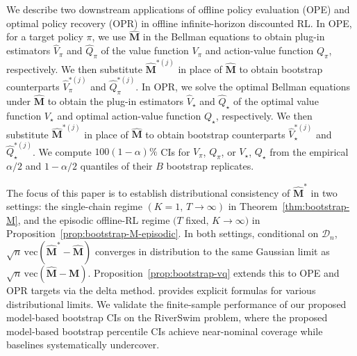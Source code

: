 \documentclass{article}
\numberwithin{equation}{section}
\begin{document}
We describe two downstream applications of offline policy evaluation (OPE) and optimal policy recovery (OPR) in offline infinite-horizon discounted RL.
In OPE, for a target policy $\pi$, we use $\hat{\mathbf{M}}$ in the Bellman equations to obtain plug-in estimators $\hat V_\pi$ and $\hat Q_\pi$ of the value function $V_\pi$ and action-value function $Q_\pi$, respectively.
We then substitute $\hat{\mathbf{M}}^{\ast(j)}$ in place of $\hat{\mathbf{M}}$ to obtain bootstrap counterparts $\hat V_\pi^{\ast(j)}$ and $\hat Q_\pi^{\ast(j)}$.
In OPR, we solve the optimal Bellman equations under $\hat{\mathbf{M}}$ to obtain the plug-in estimators $\hat V_\star$ and $\hat Q_\star$ of the optimal value function $V_\star$ and optimal action-value function $Q_\star$, respectively.
We then substitute $\hat{\mathbf{M}}^{\ast(j)}$ in place of $\hat{\mathbf{M}}$ to obtain bootstrap counterparts $\hat V_\star^{\ast(j)}$ and $\hat Q_\star^{\ast(j)}$.
We compute $100(1-\alpha)\%$ CIs for $V_\pi$, $Q_\pi$, or $V_\star$, $Q_\star$ from the empirical $\alpha/2$ and $1-\alpha/2$ quantiles of their $B$ bootstrap replicates.

The focus of this paper is to establish distributional consistency of $\hat{\mathbf{M}}^\ast$ in two settings: the single-chain regime $(K=1,\,T\to\infty)$ in Theorem~\ref{thm:bootstrap-M}, and the episodic offline-RL regime $(T$ fixed$,\,K\to\infty)$ in Proposition~\ref{prop:bootstrap-M-episodic}.
In both settings, conditional on $\mathcal{D}_n$, $\sqrt{n}\,\mathrm{vec}(\hat{\mathbf{M}}^\ast - \hat{\mathbf{M}})$ converges in distribution to the same Gaussian limit as $\sqrt{n}\,\mathrm{vec}(\hat{\mathbf{M}} - \mathbf{M})$.
Proposition~\ref{prop:bootstrap-vq} extends this to OPE and OPR targets via the delta method.
\citet{su2025centrallimittheoremstransition} provides explicit formulas for various distributional limits.
We validate the finite-sample performance of our proposed model-based bootstrap CIs on the RiverSwim problem, where the proposed model-based bootstrap percentile CIs achieve near-nominal coverage while baselines systematically undercover.
\end{document}
